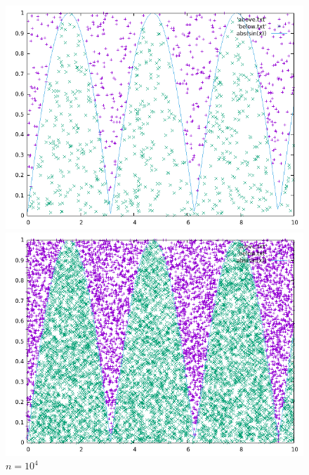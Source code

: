 \documentclass[a4paper, 12pt, oneside]{article}
\begin{document}
	
		\begin{figure}[!htb]
			\centering
			\begin{minipage}{0.45\textwidth}
				\includegraphics[width=1\linewidth]{n1000.png}
				\caption{$n = 10^3$}
				\label{n1000}
			\end{minipage}
			\hfill
			\begin{minipage}{0.45\textwidth}
				\includegraphics[width=1\linewidth]{n10000.png}
				\caption{$n = 10^4$}
				\label{n10000}
			\end{minipage}
		\end{figure}
	
\end{document}
